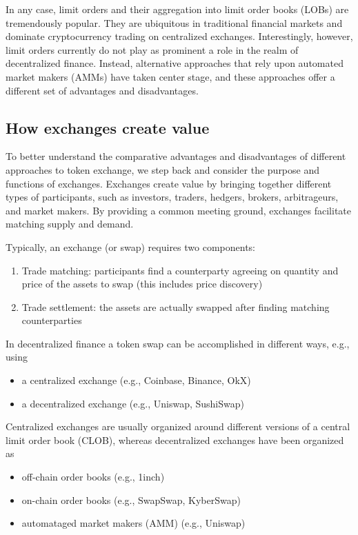 \documentclass[11pt, reqno]{amsart}
\theoremstyle{definition}
\theoremstyle{remark}
\begin{document}
In any case, limit orders and their aggregation into limit order books (LOBs)
are tremendously popular. They are ubiquitous in traditional financial markets
and dominate cryptocurrency trading on centralized exchanges. Interestingly,
however, limit orders currently do not play as prominent a role in the realm of
decentralized finance. Instead, alternative approaches that rely upon
automated market makers (AMMs) have taken center stage, and these approaches
offer a different set of advantages and disadvantages.

\subsection{How exchanges create value}
To better understand the comparative advantages and disadvantages of different
approaches to token exchange, we step back and consider the purpose and
functions of exchanges.
Exchanges create value by bringing together different types of participants,
such as investors, traders, hedgers, brokers, arbitrageurs, and market makers.
By providing a common meeting ground, exchanges facilitate matching supply
and demand.

Typically, an exchange (or swap) requires two components:
\begin{enumerate}
	\item Trade matching: participants find a counterparty agreeing on quantity
	      and price of the assets to swap (this includes price discovery)
	\item Trade settlement: the assets are actually swapped after finding
	      matching counterparties
\end{enumerate}

In decentralized finance a token swap can be accomplished in different ways,
e.g., using
\begin{itemize}
	\item a centralized exchange (e.g., Coinbase, Binance, OkX)
	\item a decentralized exchange (e.g., Uniswap, SushiSwap)
\end{itemize}

Centralized exchanges are usually organized around different versions of a
central limit order book (CLOB), whereas
decentralized exchanges have been organized as
\begin{itemize}
	\item off-chain order books (e.g., 1inch)
	\item on-chain order books (e.g., SwapSwap, KyberSwap)
	\item automataged market makers (AMM) (e.g., Uniswap)
\end{itemize}
\end{document}
